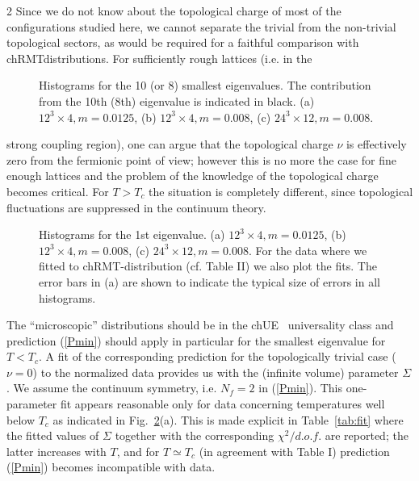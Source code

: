 \begin{multicols}{2}
Since  we do not know about the topological charge of most of  the
configurations studied here, we cannot separate the trivial from the
non-trivial topological sectors, as would be required for a faithful comparison
with chRMT\space distributions.  For sufficiently rough lattices (i.e. in the
\begin{figure}[h]
\vspace*{2mm}
\centerline{}
\centerline{}
\centerline{}
\vspace*{2mm}
\caption{Histograms for the 10 (or 8) smallest eigenvalues.
The contribution from the 10th (8th) eigenvalue is indicated in black. 
(a) $12^3\times 4, m=0.0125$, 
(b) $12^3\times 4, m=0.008$,
(c) $24^3\times 12, m=0.008$.}
\label{all-dist}
\end{figure}
\noindent strong coupling region), one can argue \cite{BeMeWe98} that the
topological charge $\nu$ is effectively zero from the fermionic point of view;
however this is no more the case for fine enough lattices \cite{FaHiLa99} and
the problem of the knowledge of the topological charge becomes critical. For
$T>T_c$ the situation is completely different, since topological fluctuations
are suppressed in the continuum theory.


\begin{figure}[h]
\centerline{}
\centerline{}
\centerline{}
\caption{Histograms for the 1st eigenvalue. (a) $12^3\times
4, m=0.0125$, (b) $12^3\times 4, m=0.008$, (c) $24^3\times 12, m=0.008$. 
For the data where we fitted to chRMT-distribution (cf. Table II) we also plot the
fits. The error bars in (a) are shown to indicate the  typical size of errors in all
histograms. }
\label{firstevs}
\end{figure}

The ``microscopic'' distributions should be in the chUE~ universality class and
prediction (\ref{Pmin}) should apply in particular for the smallest eigenvalue
for $T<T_c$. A fit of the corresponding  prediction  for the topologically
trivial case ($\nu=0$) to the normalized data provides us with the (infinite
volume) parameter $\Sigma$.   We assume the continuum symmetry, i.e. $N_f=2$ in
(\ref{Pmin}). This one-parameter fit appears reasonable only for data
concerning temperatures well below $T_c$ as indicated in
Fig.~\ref{firstevs}(a).  This is made explicit in Table~\ref{tab:fit} where
the  fitted values of $\Sigma$ together with the corresponding $\chi^2/d.o.f.$
are reported; the latter increases with $T$,  and for $T\simeq T_c$ (in
agreement with Table I) prediction (\ref{Pmin}) becomes incompatible with data.


\end{multicols}
